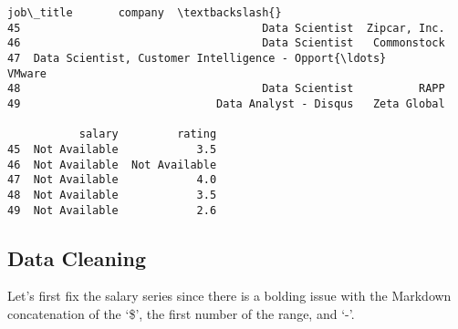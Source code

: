\documentclass[11pt]{article}
\makeatletter
\newcommand{\boxspacing}{\kern\kvtcb@left@rule\kern\kvtcb@boxsep}
\newcommand{\prompt}[4]{
        \ttfamily\llap{{\color{#2}[#3]:\hspace{3pt}#4}}\vspace{-\baselineskip}
    }
\makeatother
\begin{document}
            \begin{tcolorbox}[breakable, size=fbox, boxrule=.5pt, pad at break*=1mm, opacityfill=0]
\prompt{Out}{outcolor}{17}{\boxspacing}
\begin{Verbatim}[commandchars=\\\{\}]
                                            job\_title       company  \textbackslash{}
45                                     Data Scientist  Zipcar, Inc.
46                                     Data Scientist   Commonstock
47  Data Scientist, Customer Intelligence - Opport{\ldots}        VMware
48                                     Data Scientist          RAPP
49                              Data Analyst - Disqus   Zeta Global

           salary         rating
45  Not Available            3.5
46  Not Available  Not Available
47  Not Available            4.0
48  Not Available            3.5
49  Not Available            2.6
\end{Verbatim}
\end{tcolorbox}
        
    \hypertarget{data-cleaning}{%
\subsection{Data Cleaning}\label{data-cleaning}}

    Let's first fix the salary series since there is a bolding issue with
the Markdown concatenation of the `\$', the first number of the range,
and `-'.
\end{document}
